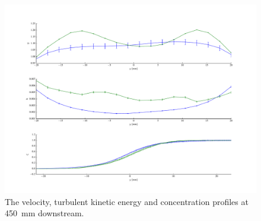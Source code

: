 \documentclass[11 pt]{article}
\begin{document}
\begin{appendices}
\begin{figure}[h]
			\includegraphics[width=\textwidth]{three_450.pdf}
			\caption{The velocity, turbulent kinetic energy and concentration profiles at \SI{450}{mm} downstream. }
		\end{figure}

\end{appendices}
\end{document}
